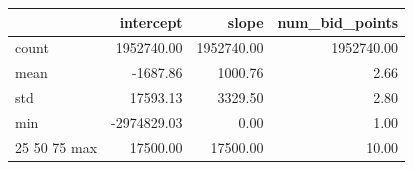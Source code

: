 \begin{tabular}{lrrr}
\toprule
 & intercept & slope & num_bid_points \\
\midrule
count & 1952740.00 & 1952740.00 & 1952740.00 \\
mean & -1687.86 & 1000.76 & 2.66 \\
std & 17593.13 & 3329.50 & 2.80 \\
min & -2974829.03 & 0.00 & 1.00 \\
25%
50%
75%
max & 17500.00 & 17500.00 & 10.00 \\
\bottomrule
\end{tabular}
